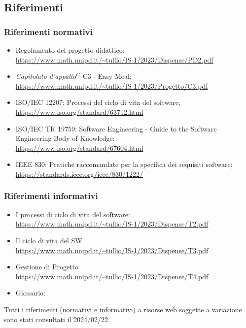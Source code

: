 \subsection{Riferimenti}
\subsubsection{Riferimenti normativi}

        \begin{itemize}
            \item Regolamento del progetto didattico: \\
            \url{https://www.math.unipd.it/~tullio/IS-1/2023/Dispense/PD2.pdf}
            \item \emph{Capitolato d’appalto}$^{G}$ C3 - Easy Meal: \\
            \url{https://www.math.unipd.it/~tullio/IS-1/2023/Progetto/C3.pdf} \\
            \item ISO/IEC 12207: Processi del ciclo di vita del software;\\
            \url{https://www.iso.org/standard/63712.html}
            \item ISO/IEC TR 19759: Software Engineering - Guide to the Software Engineering Body of Knowledge; \\
            \url{https://www.iso.org/standard/67604.html}
            \item IEEE 830: Pratiche raccomandate per la specifica dei requisiti software;\\
            \url{https://standards.ieee.org/ieee/830/1222/}
        \end{itemize}

        \subsubsection{Riferimenti informativi}

        \begin{itemize}
            \item I processi di ciclo di vita del software: \\
            \url{https://www.math.unipd.it/~tullio/IS-1/2023/Dispense/T2.pdf}
            \item Il ciclo di vita del SW\\
            \url{https://www.math.unipd.it/~tullio/IS-1/2023/Dispense/T3.pdf}
            \item Gestione di Progetto\\
            \url{https://www.math.unipd.it/~tullio/IS-1/2023/Dispense/T4.pdf}
            \item Glossario: \\
            \url{} %
        \end{itemize}

        Tutti i riferimenti (normativi e informativi) a risorse web soggette a variazione sono stati consultati il 2024/02/22.

